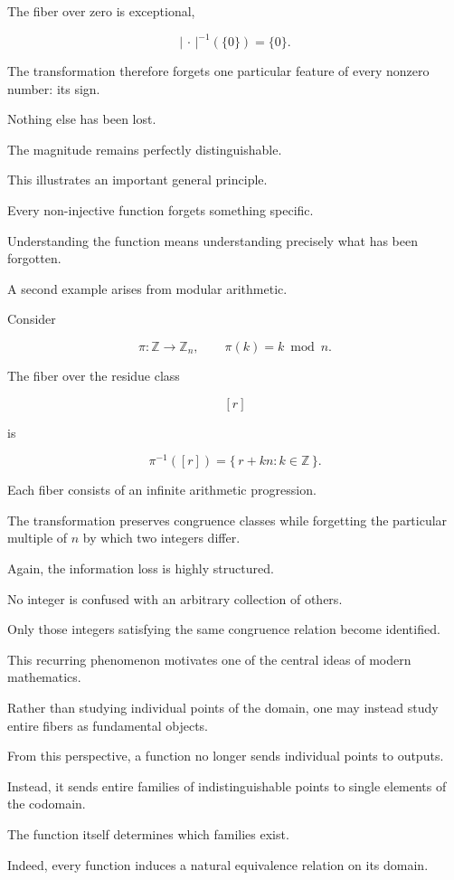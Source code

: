 \documentclass[11pt]{book}
\numberwithin{equation}{chapter}
\theoremstyle{definition}
\theoremstyle{plain}
\theoremstyle{remark}
\begin{document}
The fiber over zero is exceptional,

\[
|\,\cdot\,|^{-1}(\{0\})
=
\{0\}.
\]

The transformation therefore forgets one particular feature of every nonzero number: its sign.

Nothing else has been lost.

The magnitude remains perfectly distinguishable.

This illustrates an important general principle.

Every non-injective function forgets something specific.

Understanding the function means understanding precisely what has been forgotten.

A second example arises from modular arithmetic.

Consider

\[
\pi:\mathbb{Z}\rightarrow\mathbb{Z}_n,
\qquad
\pi(k)=k\bmod n.
\]

The fiber over the residue class

\[
[r]
\]

is

\[
\pi^{-1}([r])
=
\{\,r+kn:k\in\mathbb{Z}\,\}.
\]

Each fiber consists of an infinite arithmetic progression.

The transformation preserves congruence classes while forgetting the particular multiple of \(n\) by which two integers differ.

Again, the information loss is highly structured.

No integer is confused with an arbitrary collection of others.

Only those integers satisfying the same congruence relation become identified.

This recurring phenomenon motivates one of the central ideas of modern mathematics.

Rather than studying individual points of the domain, one may instead study entire fibers as fundamental objects.

From this perspective, a function no longer sends individual points to outputs.

Instead, it sends entire families of indistinguishable points to single elements of the codomain.

The function itself determines which families exist.

Indeed, every function induces a natural equivalence relation on its domain.
\end{document}
